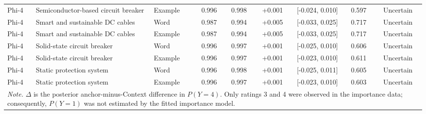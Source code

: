 \begin{landscape}
\begin{longtable}{lllcccccc}
Phi-4 & Semiconductor-based circuit breaker & Example & 0.996 & 0.998 & +0.001 & [-0.024, 0.010] & 0.597 & Uncertain \\
Phi-4 & Smart and sustainable DC cables & Word & 0.987 & 0.994 & +0.005 & [-0.033, 0.025] & 0.717 & Uncertain \\
Phi-4 & Smart and sustainable DC cables & Example & 0.987 & 0.994 & +0.005 & [-0.033, 0.025] & 0.717 & Uncertain \\
Phi-4 & Solid-state circuit breaker & Word & 0.996 & 0.997 & +0.001 & [-0.025, 0.010] & 0.606 & Uncertain \\
Phi-4 & Solid-state circuit breaker & Example & 0.996 & 0.997 & +0.001 & [-0.023, 0.010] & 0.611 & Uncertain \\
Phi-4 & Static protection system & Word & 0.996 & 0.998 & +0.001 & [-0.025, 0.011] & 0.605 & Uncertain \\
Phi-4 & Static protection system & Example & 0.996 & 0.997 & +0.001 & [-0.023, 0.010] & 0.603 & Uncertain \\
\midrule
\multicolumn{9}{p{0.96\linewidth}}{\footnotesize\textit{Note.} $\Delta$ is the posterior anchor-minus-Context difference in $P(Y=4)$. Only ratings 3 and 4 were observed in the importance data; consequently, $P(Y=1)$ was not estimated by the fitted importance model.}\\
\end{longtable}
\end{landscape}
